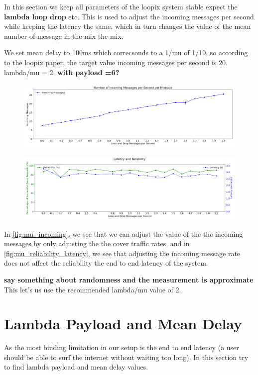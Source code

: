 \documentclass[a4paper,11pt,oneside]{report}
\begin{document}
In this section we keep all parameters of the loopix system stable expect the \textbf{lambda loop drop} etc. This is used to adjust the incoming messages per second while keeping the latency the same, which in turn changes the value of the mean number of message in the mix the mix.

We set mean delay to 100ms which correcsonds to a 1/mu of 1/10, so according to the loopix paper, the target value incoming messages per second is 20. lambda/mu = 2. \textbf{with payload =6?}

\begin{figure}[htbp]
    \centering
    \includegraphics[width=\textwidth]{plots/mu_incoming_messages.png}
    \caption{}
    \label{fig:mu_incoming}
\end{figure}

\begin{figure}[htbp]
    \centering
    \includegraphics[width=\textwidth]{plots/mu_reliability_latency.png}
    \caption{}
    \label{fig:mu_reliability_latency}
\end{figure}

In \autoref{fig:mu_incoming}, we see that we can adjust the value of the the incoming messages by only adjusting the the cover traffic rates, and in \autoref{fig:mu_reliability_latency}, we see that adjusting the incoming message rate does not affect the reliability the end to end latency of the system.

\textbf{say something about randomness and the measurement is approximate}
This let's us use the recommended lambda/mu value of 2.

\section{Lambda Payload and Mean Delay}
As the most binding limitation in our setup is the end to end latency (a user should be able to surf the internet without waiting too long). In this section try to find lambda payload and mean delay values.
\end{document}
